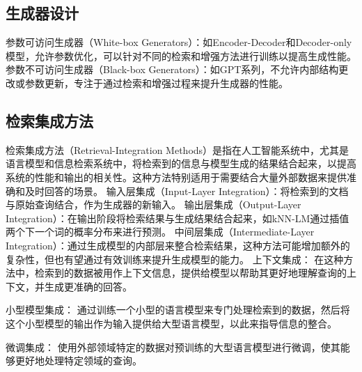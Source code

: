 \subsection{生成器设计}

参数可访问生成器\cite{2022Compare}（White-box Generators）：如Encoder-Decoder和Decoder-only模型，允许参数优化，可以针对不同的检索和增强方法进行训练以提高生成性能。
参数不可访问生成器（Black-box Generators）：如GPT系列，不允许内部结构更改或参数更新，专注于通过检索和增强过程来提升生成器的性能。
\subsection{检索集成方法}
检索集成方法（Retrieval-Integration Methods）是指在人工智能系统中，尤其是语言模型和信息检索系统中，将检索到的信息与模型生成的结果结合起来，以提高系统的性能和输出的相关性。这种方法特别适用于需要结合大量外部数据来提供准确和及时回答的场景。
输入层集成（Input-Layer Integration）：将检索到的文档与原始查询结合，作为生成器的新输入。
输出层集成（Output-Layer Integration）：在输出阶段将检索结果与生成结果结合起来，如kNN-LM通过插值两个下一个词的概率分布来进行预测。
中间层集成（Intermediate-Layer Integration）：通过生成模型的内部层来整合检索结果，这种方法可能增加额外的复杂性，但也有望通过有效训练来提升生成模型的能力\cite{abeysinghe2023architectingintermediatelayersefficient}。
上下文集成：
在这种方法中，检索到的数据被用作上下文信息，提供给模型以帮助其更好地理解查询的上下文，并生成更准确的回答。

小型模型集成：
通过训练一个小型的语言模型来专门处理检索到的数据，然后将这个小型模型的输出作为输入提供给大型语言模型，以此来指导信息的整合。

微调集成：
使用外部领域特定的数据对预训练的大型语言模型进行微调，使其能够更好地处理特定领域的查询。 \cite{zhao2024retrievalaugmentedgenerationrag}
